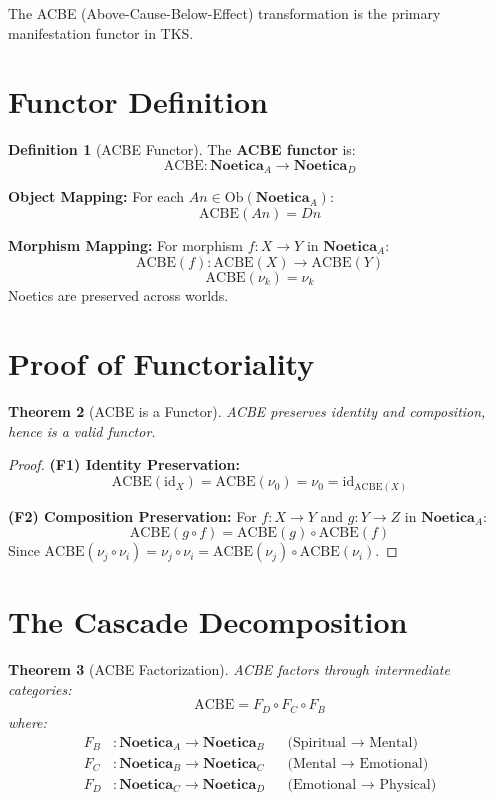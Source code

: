 \documentclass[11pt,twoside,openright]{book}
\theoremstyle{definition}
\newtheorem{definition}{Definition}[chapter]
\theoremstyle{plain}
\newtheorem{theorem}[definition]{Theorem}
\theoremstyle{remark}
\newcommand{\Noetica}{\mathbf{Noetica}}
\newcommand{\noe}[1]{\nu_{#1}}
\newcommand{\Ob}{\mathrm{Ob}}
\newcommand{\id}{\mathrm{id}}
\begin{document}
The ACBE (Above-Cause-Below-Effect) transformation is the primary manifestation functor in TKS.

\section{Functor Definition}

\begin{definition}[ACBE Functor]
\label{def:acbe-functor}
The \textbf{ACBE functor} is:
\[
\mathrm{ACBE} : \Noetica_A \to \Noetica_D
\]

\textbf{Object Mapping:}
For each $An \in \Ob(\Noetica_A)$:
\[
\mathrm{ACBE}(An) = Dn
\]

\textbf{Morphism Mapping:}
For morphism $f : X \to Y$ in $\Noetica_A$:
\[
\mathrm{ACBE}(f) : \mathrm{ACBE}(X) \to \mathrm{ACBE}(Y)
\]
\[
\mathrm{ACBE}(\noe{k}) = \noe{k}
\]
Noetics are preserved across worlds.
\end{definition}

\section{Proof of Functoriality}

\begin{theorem}[ACBE is a Functor]
\label{thm:acbe-functor}
ACBE preserves identity and composition, hence is a valid functor.
\end{theorem}

\begin{proof}
\textbf{(F1) Identity Preservation:}
\[
\mathrm{ACBE}(\id_X) = \mathrm{ACBE}(\noe{0}) = \noe{0} = \id_{\mathrm{ACBE}(X)}
\]

\textbf{(F2) Composition Preservation:}
For $f : X \to Y$ and $g : Y \to Z$ in $\Noetica_A$:
\[
\mathrm{ACBE}(g \circ f) = \mathrm{ACBE}(g) \circ \mathrm{ACBE}(f)
\]
Since $\mathrm{ACBE}(\noe{j} \circ \noe{i}) = \noe{j} \circ \noe{i} = \mathrm{ACBE}(\noe{j}) \circ \mathrm{ACBE}(\noe{i})$.
\end{proof}

\section{The Cascade Decomposition}

\begin{theorem}[ACBE Factorization]
\label{thm:acbe-factor}
ACBE factors through intermediate categories:
\[
\mathrm{ACBE} = F_D \circ F_C \circ F_B
\]
where:
\begin{align}
F_B &: \Noetica_A \to \Noetica_B && \text{(Spiritual } \to \text{ Mental)} \\
F_C &: \Noetica_B \to \Noetica_C && \text{(Mental } \to \text{ Emotional)} \\
F_D &: \Noetica_C \to \Noetica_D && \text{(Emotional } \to \text{ Physical)}
\end{align}
\end{theorem}
\end{document}
